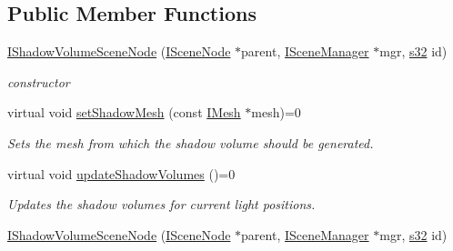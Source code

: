 \subsection*{Public Member Functions}
\begin{DoxyCompactItemize}
\item 
\mbox{\label{classirr_1_1scene_1_1IShadowVolumeSceneNode_aa2d604d5c4ec96b053c7f711a1ade25e}} 
\hyperlink{classirr_1_1scene_1_1IShadowVolumeSceneNode_aa2d604d5c4ec96b053c7f711a1ade25e}{I\+Shadow\+Volume\+Scene\+Node} (\hyperlink{classirr_1_1scene_1_1ISceneNode}{I\+Scene\+Node} $\ast$parent, \hyperlink{classirr_1_1scene_1_1ISceneManager}{I\+Scene\+Manager} $\ast$mgr, \hyperlink{namespaceirr_ac66849b7a6ed16e30ebede579f9b47c6}{s32} id)
\begin{DoxyCompactList}\small\item\em constructor \end{DoxyCompactList}\item 
virtual void \hyperlink{classirr_1_1scene_1_1IShadowVolumeSceneNode_a69af3aa713c909106bacccdbab01184d}{set\+Shadow\+Mesh} (const \hyperlink{classirr_1_1scene_1_1IMesh}{I\+Mesh} $\ast$mesh)=0
\begin{DoxyCompactList}\small\item\em Sets the mesh from which the shadow volume should be generated. \end{DoxyCompactList}\item 
\mbox{\label{classirr_1_1scene_1_1IShadowVolumeSceneNode_a3fa8470e9aa103a449eb365bfff4ef13}} 
virtual void \hyperlink{classirr_1_1scene_1_1IShadowVolumeSceneNode_a3fa8470e9aa103a449eb365bfff4ef13}{update\+Shadow\+Volumes} ()=0
\begin{DoxyCompactList}\small\item\em Updates the shadow volumes for current light positions. \end{DoxyCompactList}\item 
\mbox{\label{classirr_1_1scene_1_1IShadowVolumeSceneNode_aa2d604d5c4ec96b053c7f711a1ade25e}} 
\hyperlink{classirr_1_1scene_1_1IShadowVolumeSceneNode_aa2d604d5c4ec96b053c7f711a1ade25e}{I\+Shadow\+Volume\+Scene\+Node} (\hyperlink{classirr_1_1scene_1_1ISceneNode}{I\+Scene\+Node} $\ast$parent, \hyperlink{classirr_1_1scene_1_1ISceneManager}{I\+Scene\+Manager} $\ast$mgr, \hyperlink{namespaceirr_ac66849b7a6ed16e30ebede579f9b47c6}{s32} id)

\end{DoxyCompactItemize}
